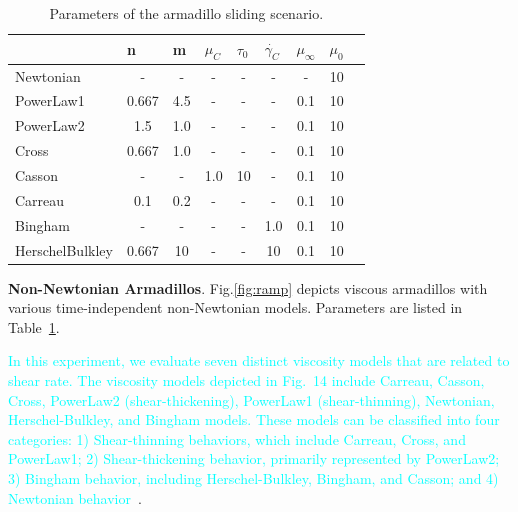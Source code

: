\documentclass[10pt,journal,compsoc]{IEEEtran}
\newcommand{\revised}[1]{{\textcolor{cyan}{#1}}}
\begin{document}
\begin{table}[]
	\caption{Parameters of the armadillo sliding scenario.}
	\centering
	\begin{tabular}{lcccccccc}
		\toprule
		                                     &
		\multicolumn{1}{l}{n}                &
		\multicolumn{1}{l}{m}                &
		\multicolumn{1}{l}{$\mu_C$}          &
		\multicolumn{1}{l}{$\tau_0$}         &
		\multicolumn{1}{l}{$\dot{\gamma_C}$} &
		\multicolumn{1}{l}{$\mu_{\infty}$}   &
		\multicolumn{1}{l}{$\mu_{0}$}                                                  \\
		\midrule
		Newtonian                            & -     & -   & -   & -  & -   & -   & 10 \\
		PowerLaw1                            & 0.667 & 4.5 & -   & -  & -   & 0.1 & 10 \\
		PowerLaw2                            & 1.5   & 1.0 & -   & -  & -   & 0.1 & 10 \\
		Cross                                & 0.667 & 1.0 & -   & -  & -   & 0.1 & 10 \\
		Casson                               & -     & -   & 1.0 & 10 & -   & 0.1 & 10 \\
		Carreau                              & 0.1   & 0.2 & -   & -  & -   & 0.1 & 10 \\
		Bingham                              & -     & -   & -   & -  & 1.0 & 0.1 & 10 \\
		HerschelBulkley                      & 0.667 & 10  & -   & -  & 10  & 0.1 & 10 \\
		\bottomrule
	\end{tabular}\label{tab:armadillo-params}
\end{table}



\textbf{Non-Newtonian Armadillos}.
Fig.\ref{fig:ramp} depicts viscous armadillos with various time-independent non-Newtonian models. Parameters are listed in Table~\ref{tab:armadillo-params}.

\revised{In this experiment, we evaluate seven distinct viscosity models that are related to shear rate. The viscosity models depicted in Fig.~14 include Carreau, Casson, Cross, PowerLaw2 (shear-thickening), PowerLaw1 (shear-thinning), Newtonian, Herschel-Bulkley, and Bingham models. These models can be classified into four categories: 1) Shear-thinning behaviors, which include Carreau, Cross, and PowerLaw1; 2) Shear-thickening behavior, primarily represented by PowerLaw2; 3) Bingham behavior, including Herschel-Bulkley, Bingham, and Casson; and 4) Newtonian behavior~\cite{Chhabra2010,Phan2017}}.
\end{document}
